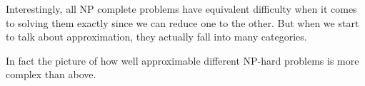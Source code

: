 \documentclass[en,hazy,blue,normal,12pt]{elegantnote}
\begin{document}
Interestingly, all NP complete problems have equivalent difficulty when it comes to solving them exactly since we can reduce one to the other. But when we start to talk about approximation, they actually fall into many categories. 

In fact the picture of how well approximable different NP-hard problems is more complex than above.
\end{document}
